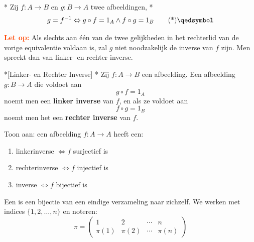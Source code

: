\begin{nicetheorem}*
    Zij $f : A \rightarrow B$ en $g : B \rightarrow A$ twee afbeeldingen,
    \nextpart[Dan is]*
    \begin{equation}
        g = f^{-1} \Leftrightarrow g \circ f = 1_A \land f \circ g = 1_B \qedtag
    \end{equation}
\end{nicetheorem}

\begin{barbox}[OrangeRed][gray!5]
    \textcolor{OrangeRed}{\textbf{Let op:}} Als slechts aan één van de twee gelijkheden in het rechterlid van de vorige equivalentie voldaan is, zal $g$ niet noodzakelijk de inverse van $f$ zijn. Men spreekt dan van linker- en rechter inverse. 
\end{barbox}

\begin{nicedefinition}*[Linker- en Rechter Inverse]
    \nextpart[Definitie.]*
    Zij $f : A \rightarrow B$ een afbeelding. Een afbeelding $g : B \rightarrow A$ die voldoet aan
    \begin{equation*}
        g \circ f = 1_A
    \end{equation*}
    noemt men een \textcolor{PineGreen!75!black}{\textbf{linker inverse}} van $f$, en als ze voldoet aan
    \begin{equation*}
        f \circ g = 1_B
    \end{equation*}
    noemt men het een \textcolor{PineGreen!75!black}{\textbf{rechter inverse}} van $f$.
\end{nicedefinition}

\begin{niceexercise}\label{exercise:L2_iverses}
    Toon aan: een afbeelding $f : A \to A$ heeft een:
    \begin{enumerate}
        \item linkerinverse $\iff f$ surjectief is
        \item rechterinverse $\iff f$ injectief is
        \item inverse $\iff f$ bijectief is
    \end{enumerate} 
\end{niceexercise}



Een  is een bijectie van een eindige verzameling naar zichzelf. We werken met indices $\{1,2,\dots,n\}$ en noteren:
\begin{equation}
    \pi = \begin{pmatrix}
        1       & 2       & \cdots & n \\
        \pi (1) & \pi (2) & \cdots & \pi (n)
    \end{pmatrix}
\end{equation}

